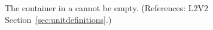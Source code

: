 The  container in a \UnitDefinition cannot be
empty.  (References: L2V2 Section~\ref{sec:unitdefinitions}.)
